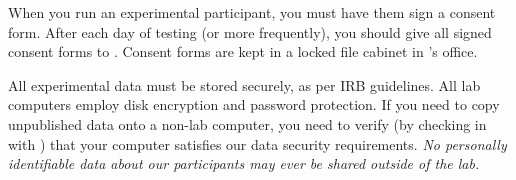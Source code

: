 \documentclass{tufte-book} %
\begin{document}

   When you run an experimental participant, you must have them sign a
   consent form.  After each day of testing (or more frequently), you
   should give all signed consent forms to \coordinator.  Consent
   forms are kept in a locked file cabinet in \director 's office.

   All experimental data must be stored securely, as per IRB
   guidelines.  All lab computers employ disk encryption and password
   protection.  If you need to copy unpublished data onto a non-lab
   computer, you need to verify (by checking in with \director) that
   your computer satisfies our data security requirements.  \textit{No
     personally identifiable data about our participants may ever be
     shared outside of the lab.}
\end{document}
